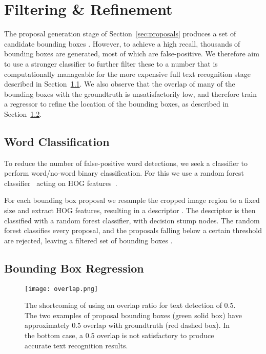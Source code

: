 \documentclass[twocolumn]{svjour3}          \smartqed  \usepackage{epsfig}
\begin{document}
\section{Filtering \& Refinement}
\label{sec:filtering}
The proposal generation stage of Section~\ref{sec:proposals} produces a set of candidate bounding boxes . However, to achieve a high recall, thousands of bounding boxes are generated, most of which are false-positive. We therefore aim to use a stronger classifier to further filter these to a number that is computationally manageable for the more expensive full text recognition stage described in Section~\ref{sec:classification}. We also observe that the overlap of many of the bounding boxes with the groundtruth is unsatisfactorily low, and therefore train a regressor to refine the location of the bounding boxes, as described in Section~\ref{sec:regression}. 

\subsection{Word Classification}
\label{sec:classification}
To reduce the number of false-positive word detections, we seek a classifier to perform word/no-word binary classification. For this we use a random forest classifier~\cite{Breiman01} acting on HOG features~\cite{Felzenszwalb10a}. 

For each bounding box proposal  we resample the cropped image region to a fixed size and extract HOG features, resulting in a descriptor . The descriptor is then classified with a random forest classifier, with decision stump nodes. The random forest classifies every proposal, and the proposals falling below a certain threshold are rejected, leaving a filtered set of bounding boxes .

\subsection{Bounding Box Regression}
\label{sec:regression}

\begin{figure}
\begin{center}
\texttt{[image: overlap.png]} 
\caption{The shortcoming of using an overlap ratio for text detection of 0.5. The two examples of proposal bounding boxes (green solid box) have approximately 0.5 overlap with groundtruth (red dashed box). In the bottom case, a 0.5 overlap is not satisfactory to produce accurate text recognition results.}
\label{fig:overlap}
\end{center}
\end{figure}
\end{document}

